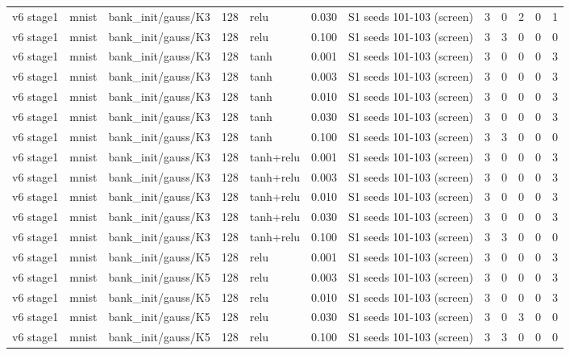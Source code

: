 \begin{table}[htbp]
{\begin{tabular}{@{}lllrlrlrrrrr@{}}
v6 stage1 & mnist & bank\_init/gauss/K3 & 128 & relu & 0.030 & S1 seeds 101-103 (screen) & 3 & 0 & 2 & 0 & 1 \\
v6 stage1 & mnist & bank\_init/gauss/K3 & 128 & relu & 0.100 & S1 seeds 101-103 (screen) & 3 & 3 & 0 & 0 & 0 \\
v6 stage1 & mnist & bank\_init/gauss/K3 & 128 & tanh & 0.001 & S1 seeds 101-103 (screen) & 3 & 0 & 0 & 0 & 3 \\
v6 stage1 & mnist & bank\_init/gauss/K3 & 128 & tanh & 0.003 & S1 seeds 101-103 (screen) & 3 & 0 & 0 & 0 & 3 \\
v6 stage1 & mnist & bank\_init/gauss/K3 & 128 & tanh & 0.010 & S1 seeds 101-103 (screen) & 3 & 0 & 0 & 0 & 3 \\
v6 stage1 & mnist & bank\_init/gauss/K3 & 128 & tanh & 0.030 & S1 seeds 101-103 (screen) & 3 & 0 & 0 & 0 & 3 \\
v6 stage1 & mnist & bank\_init/gauss/K3 & 128 & tanh & 0.100 & S1 seeds 101-103 (screen) & 3 & 3 & 0 & 0 & 0 \\
v6 stage1 & mnist & bank\_init/gauss/K3 & 128 & tanh+relu & 0.001 & S1 seeds 101-103 (screen) & 3 & 0 & 0 & 0 & 3 \\
v6 stage1 & mnist & bank\_init/gauss/K3 & 128 & tanh+relu & 0.003 & S1 seeds 101-103 (screen) & 3 & 0 & 0 & 0 & 3 \\
v6 stage1 & mnist & bank\_init/gauss/K3 & 128 & tanh+relu & 0.010 & S1 seeds 101-103 (screen) & 3 & 0 & 0 & 0 & 3 \\
v6 stage1 & mnist & bank\_init/gauss/K3 & 128 & tanh+relu & 0.030 & S1 seeds 101-103 (screen) & 3 & 0 & 0 & 0 & 3 \\
v6 stage1 & mnist & bank\_init/gauss/K3 & 128 & tanh+relu & 0.100 & S1 seeds 101-103 (screen) & 3 & 3 & 0 & 0 & 0 \\
v6 stage1 & mnist & bank\_init/gauss/K5 & 128 & relu & 0.001 & S1 seeds 101-103 (screen) & 3 & 0 & 0 & 0 & 3 \\
v6 stage1 & mnist & bank\_init/gauss/K5 & 128 & relu & 0.003 & S1 seeds 101-103 (screen) & 3 & 0 & 0 & 0 & 3 \\
v6 stage1 & mnist & bank\_init/gauss/K5 & 128 & relu & 0.010 & S1 seeds 101-103 (screen) & 3 & 0 & 0 & 0 & 3 \\
v6 stage1 & mnist & bank\_init/gauss/K5 & 128 & relu & 0.030 & S1 seeds 101-103 (screen) & 3 & 0 & 3 & 0 & 0 \\
v6 stage1 & mnist & bank\_init/gauss/K5 & 128 & relu & 0.100 & S1 seeds 101-103 (screen) & 3 & 3 & 0 & 0 & 0 \\

\end{tabular}}
\end{table}
